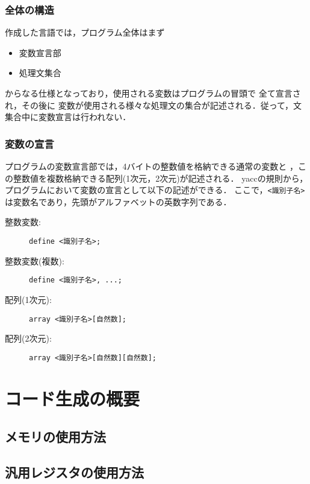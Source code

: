 \subsubsection{全体の構造}
作成した言語では，プログラム全体はまず
\begin{itemize}
  \item 変数宣言部
  \item 処理文集合
\end{itemize}
からなる仕様となっており，使用される変数はプログラムの冒頭で
全て宣言され，その後に
変数が使用される様々な処理文の集合が記述される．従って，文集合中に変数宣言は行われない．

\subsubsection{変数の宣言}
プログラムの変数宣言部では，4バイトの整数値を格納できる通常の変数と
，この整数値を複数格納できる配列(1次元，2次元)が記述される．
yaccの規則から，プログラムにおいて変数の宣言として以下の記述ができる．
ここで，\verb|<識別子名>|は変数名であり，先頭がアルファベットの英数字列である．
\begin{description}
  \item[整数変数:] \verb|define <識別子名>;|
  \item[整数変数(複数):] \verb|define <識別子名>, ...;|
  \item[配列(1次元):] \verb|array <識別子名>[自然数];|
  \item[配列(2次元):] \verb|array <識別子名>[自然数][自然数];|
\end{description}

\subsubsection{}

\section{コード生成の概要}

\subsection{メモリの使用方法}

\subsection{汎用レジスタの使用方法}

